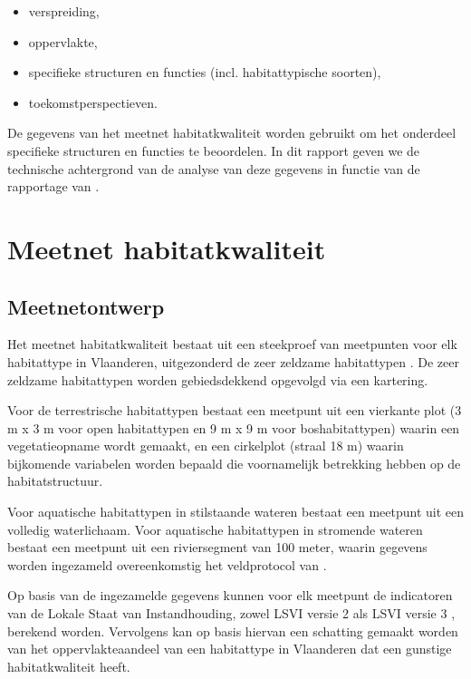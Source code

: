 \documentclass[twoside]{extreport}
\begin{document}
\begin{itemize}
\tightlist
\item
  verspreiding,
\item
  oppervlakte,
\item
  specifieke structuren en functies (incl. habitattypische soorten),
\item
  toekomstperspectieven.
\end{itemize}

De gegevens van het meetnet habitatkwaliteit worden gebruikt om het
onderdeel specifieke structuren en functies te beoordelen. In dit
rapport geven we de technische achtergrond van de analyse van deze
gegevens in functie van de rapportage van \citet{Paelinckx2019}.

\section{Meetnet habitatkwaliteit}\label{meetnet-habitatkwaliteit}

\subsection{Meetnetontwerp}\label{h:meetnetontwerp}

Het meetnet habitatkwaliteit bestaat uit een steekproef van meetpunten
voor elk habitattype in Vlaanderen, uitgezonderd de zeer zeldzame
habitattypen \citep{Westra2014}. De zeer zeldzame habitattypen worden
gebiedsdekkend opgevolgd via een kartering.

Voor de terrestrische habitattypen bestaat een meetpunt uit een
vierkante plot (3 m x 3 m voor open habitattypen en 9 m x 9 m voor
boshabitattypen) waarin een vegetatieopname \citep{INBO2016a} wordt
gemaakt, en een cirkelplot (straal 18 m) waarin bijkomende variabelen
worden bepaald die voornamelijk betrekking hebben op de
habitatstructuur.

Voor aquatische habitattypen in stilstaande wateren bestaat een meetpunt
uit een volledig waterlichaam. Voor aquatische habitattypen in stromende
wateren bestaat een meetpunt uit een riviersegment van 100 meter, waarin
gegevens worden ingezameld overeenkomstig het veldprotocol van
\citet{INBO2017}.

Op basis van de ingezamelde gegevens kunnen voor elk meetpunt de
indicatoren van de Lokale Staat van Instandhouding, zowel LSVI versie 2
\citep{TJollyn2009} als LSVI versie 3 \citep{Oosterlynck2018}, berekend
worden. Vervolgens kan op basis hiervan een schatting gemaakt worden van
het oppervlakteaandeel van een habitattype in Vlaanderen dat een
gunstige habitatkwaliteit heeft.
\end{document}
